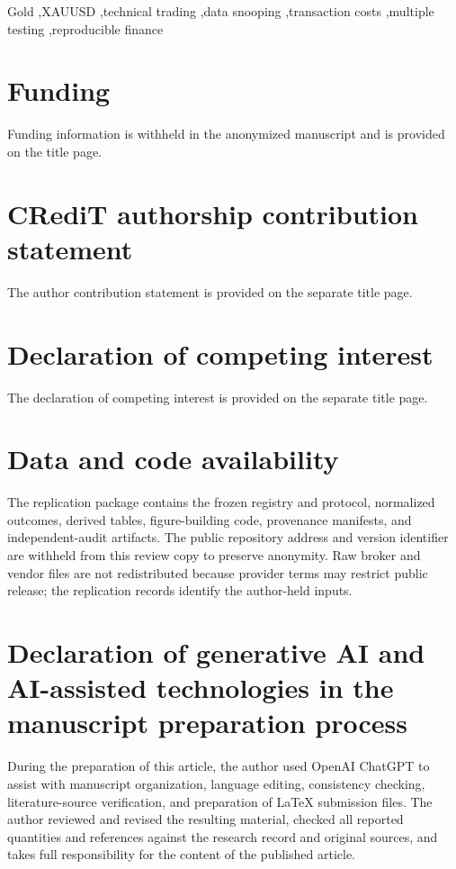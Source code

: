 \documentclass[a4paper,fleqn]{cas-sc}
\begin{document}
\begin{keywords}
Gold \sep XAUUSD \sep technical trading \sep data snooping \sep transaction costs \sep multiple testing \sep reproducible finance
\end{keywords}

\maketitle


\section*{Funding}
Funding information is withheld in the anonymized manuscript and is provided on the title page.

\section*{CRediT authorship contribution statement}
The author contribution statement is provided on the separate title page.

\section*{Declaration of competing interest}
The declaration of competing interest is provided on the separate title page.

\section*{Data and code availability}
The replication package contains the frozen registry and protocol, normalized outcomes, derived tables, figure-building code, provenance manifests, and independent-audit artifacts. The public repository address and version identifier are withheld from this review copy to preserve anonymity. Raw broker and vendor files are not redistributed because provider terms may restrict public release; the replication records identify the author-held inputs.

\section*{Declaration of generative AI and AI-assisted technologies in the manuscript preparation process}
During the preparation of this article, the author used OpenAI ChatGPT to assist with manuscript organization, language editing, consistency checking, literature-source verification, and preparation of LaTeX submission files. The author reviewed and revised the resulting material, checked all reported quantities and references against the research record and original sources, and takes full responsibility for the content of the published article.



\end{document}
